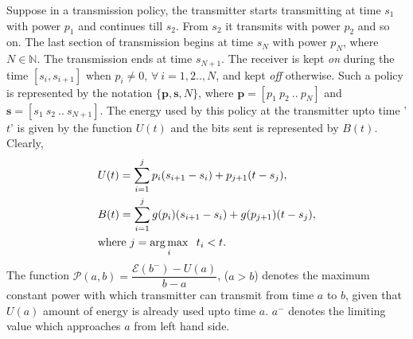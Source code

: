 Suppose in a transmission policy, the transmitter starts transmitting at time $s_1$ with power $p_1$ and continues till $s_2$. From $s_2$ it transmits with power $p_2$ and so on. The last section of transmission begins at time $s_N$ with power $p_N$, where $N\in \mathbb{N}$. The transmission ends at time $s_{N+1}$. The receiver is kept \textit{on} during the time $[s_i,s_{i+1}]$ when $p_i\ne 0$, $\forall \ i=1,2..,N$, and kept \textit{off} otherwise. Such a policy is represented by the notation $\{\textbf{p},\textbf{s},N\}$, where $\textbf{p}=[p_1\ p_2\ ..\ p_N]$ and $\textbf{s}=[s_1\ s_2\ ..\ s_{N+1}]$. The energy used by this policy at the transmitter upto time '$t$' is given by the function $U(t)$ and the bits sent is represented by $B(t)$. Clearly,
\begin{align}
&U(t)=\sum_{i=1}^{j} p_i(s_{i+1}-s_i)+p_{j+1}(t-s_j) ,
\\
&B(t)=\sum_{i=1}^{j} g(p_i)(s_{i+1}-s_i)+g(p_{j+1})(t-s_j),
\\
&\text{where }j=\operatorname*{arg\,max}_{i} \hspace{2mm}t_i<t.\nonumber
\end{align}
The function $\mathcal{P}(a,b)=\dfrac{\mathcal{E}(b^- )-U(a)}{b-a}$,  ($a>b$) denotes the maximum constant power with which transmitter can transmit from time $a$ to $b$, given that $U(a)$ amount of energy is already used upto time $a$. $a^-$ denotes the limiting value which approaches $a$ from left hand side.

